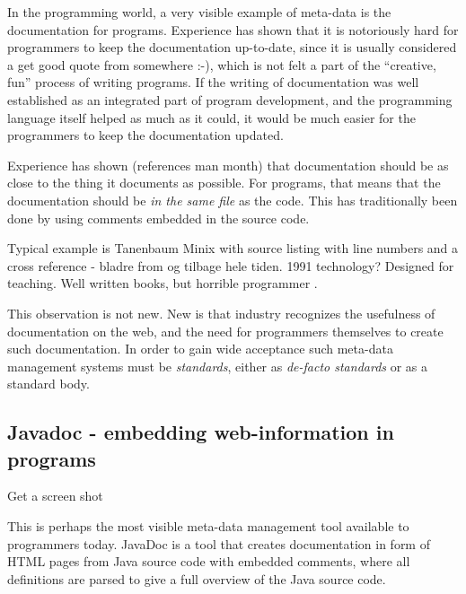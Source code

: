 In the programming world, a very visible example of meta-data is the
documentation for programs.  Experience has shown that it is
notoriously hard for programmers to keep the documentation up-to-date,
since it is usually considered a \textsf{get good quote from somewhere
  :-)}, which is not felt a part of the ``creative, fun'' process of
writing programs.  If the writing of documentation was well
established as an integrated part of program development, and the
programming language itself helped as much as it could, it would be
much easier for the programmers to keep the documentation updated.

Experience has shown (\textsf{references} man month) that
documentation should be as close to the thing it documents as
possible.  For programs, that means that the documentation should be
\textit{in the same file} as the code.  This has traditionally been
done by using comments embedded in the source code.


\textsf{Typical example is Tanenbaum Minix with source listing with
  line numbers and a cross reference - bladre from og tilbage hele
  tiden.  1991 technology?  Designed for teaching.  Well written
  books, but horrible programmer \cite{tanenbaumoperatingsystems}}.

This observation is not new.  \textsf{New is that industry recognizes
  the usefulness of documentation on the web, and the need for
  programmers themselves to create such documentation.  In order to
  gain wide acceptance such meta-data management systems must be
  \textit{standards}, either as \textit{de-facto standards} or as a
  standard body.  }

\subsection{Javadoc - embedding web-information in programs}
\label{sec:javadoc}

\textsf{Get a screen shot}

This is perhaps the most visible meta-data management tool available
to programmers today.  \textsf{JavaDoc} is a tool that creates
documentation in form of HTML pages from Java source code with
embedded comments, \textsf{where all definitions are parsed to give a
  full overview of the Java source code}.

